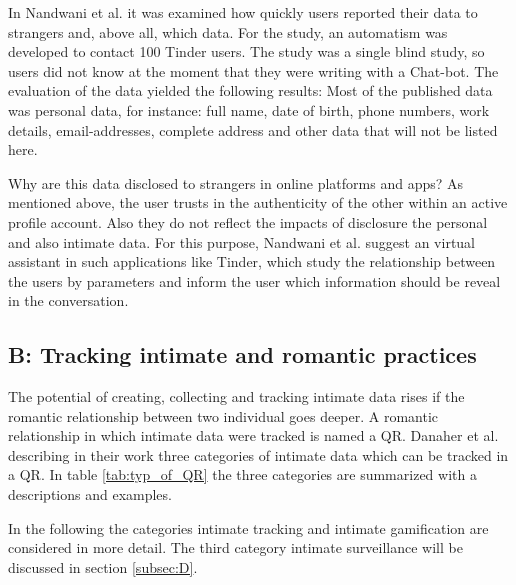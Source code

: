 In Nandwani et al. \cite{10.1007/978-3-319-61542-4_32} it was examined how quickly users reported their data to strangers and, above all, which data. For the study, an automatism was developed to contact 100 Tinder users. The study was a single blind study, so users did not know at the moment that they were writing with a Chat-bot. The evaluation of the data yielded the following results: Most of the published data was personal data, for instance: full name, date of birth, phone numbers, work details, email-addresses, complete address and other data that will not be listed here.

Why are this data disclosed to strangers in online platforms and apps? As mentioned above, the user trusts in the authenticity of the other within an active profile account. Also they do not reflect the impacts of disclosure the personal and also intimate data. For this purpose, Nandwani et al. \cite{10.1007/978-3-319-61542-4_32} suggest an virtual assistant in such applications like Tinder, which study the relationship between the users by parameters and inform the user which information should be reveal in the conversation.

\subsection{B: Tracking intimate and romantic practices}
\label{subsec:B}
The potential of creating, collecting and tracking intimate data rises if the romantic relationship between two individual goes deeper. A romantic relationship in which intimate data were tracked is named a \ac{QR}.
Danaher et al. \cite{doi:10.1080/15265161.2017.1409823} describing in their work three categories of intimate data which can be tracked in a \acs{QR}. In table \ref{tab:typ_of_QR} the three categories are summarized with a descriptions and examples.

In the following the categories intimate tracking and intimate gamification are considered in more detail.
The third category intimate surveillance will be discussed in section \ref{subsec:D}.

